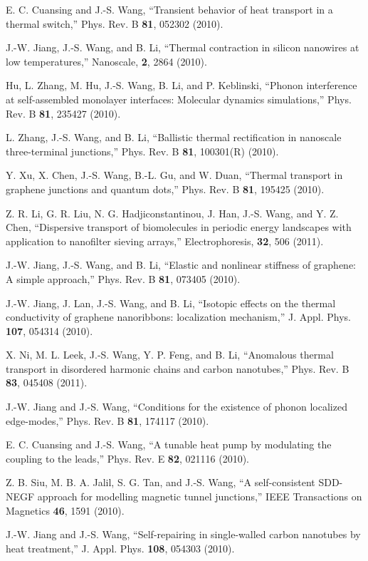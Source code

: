 \itm E. C. Cuansing and J.-S. Wang, ``Transient behavior of heat transport 
in a thermal switch,'' Phys. Rev. B {\bf 81}, 052302 (2010).

\itm J.-W. Jiang, J.-S. Wang, and B. Li, ``Thermal contraction in silicon 
nanowires at low temperatures,'' Nanoscale, {\bf 2}, 2864 (2010). 

\itm Hu, L. Zhang, M. Hu, J.-S. Wang, B. Li, and P. Keblinski, 
``Phonon interference at self-assembled monolayer interfaces: Molecular 
dynamics simulations,'' Phys. Rev. B {\bf 81}, 235427 (2010).

\itm L. Zhang, J.-S. Wang, and B. Li, ``Ballistic thermal rectification 
in nanoscale three-terminal junctions,'' Phys. Rev. B {\bf 81}, 100301(R) (2010).

\itm Y. Xu, X. Chen, J.-S. Wang, B.-L. Gu, and W. Duan, 
``Thermal transport in graphene junctions and quantum dots,'' 
Phys. Rev. B {\bf 81}, 195425 (2010).

\itm Z. R. Li, G. R. Liu, N. G. Hadjiconstantinou, J. Han, J.-S. Wang, 
and Y. Z. Chen, ``Dispersive transport of biomolecules in periodic 
energy landscapes with application to nanofilter sieving arrays,'' 
Electrophoresis, {\bf 32}, 506 (2011). 

\itm J.-W. Jiang, J.-S. Wang, and B. Li, ``Elastic and nonlinear 
stiffness of graphene: A simple approach,'' 
Phys. Rev. B {\bf 81}, 073405 (2010).

\itm J.-W. Jiang, J. Lan, J.-S. Wang, and B. Li, 
``Isotopic effects on the thermal conductivity of graphene nanoribbons: 
localization mechanism,'' J. Appl. Phys. {\bf 107}, 054314 (2010).
 
\itm X. Ni, M. L. Leek, J.-S. Wang, Y. P. Feng, and B. Li, 
``Anomalous thermal transport in disordered harmonic chains and 
carbon nanotubes,'' Phys. Rev. B {\bf 83}, 045408 (2011). 

\itm J.-W. Jiang and J.-S. Wang, 
``Conditions for the existence of phonon localized edge-modes,'' 
Phys. Rev. B {\bf 81}, 174117 (2010).

\itm E. C. Cuansing and J.-S. Wang, 
``A tunable heat pump by modulating the coupling to the leads,'' 
Phys. Rev. E {\bf 82}, 021116 (2010). 

\itm Z. B. Siu, M. B. A. Jalil, S. G. Tan, and J.-S. Wang, 
``A self-consistent SDD-NEGF approach for modelling magnetic tunnel 
junctions,'' IEEE Transactions on Magnetics {\bf 46}, 1591 (2010).

\itm J.-W. Jiang and J.-S. Wang, 
``Self-repairing in single-walled carbon nanotubes by heat treatment,'' 
J. Appl. Phys. {\bf 108}, 054303 (2010).

